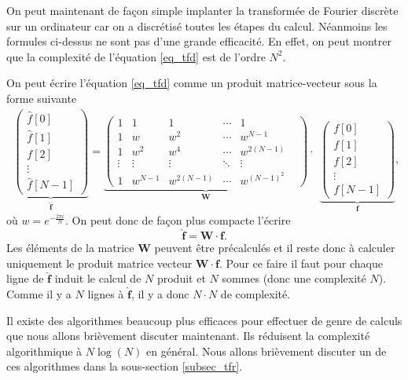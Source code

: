 \documentclass[a4paper,12pt]{book}
\newcommand{\fh}{\hat{f}}
\begin{document}
On peut maintenant de façon simple implanter la transformée de Fourier discrète sur un
ordinateur car on a discrétisé toutes les étapes du calcul. Néanmoins les formules ci-dessus 
ne sont pas d'une grande efficacité. En effet, on peut montrer que la complexité de
l'équation \eqref{eq_tfd} est de l'ordre $N^2$. 

On peut écrire l'équation \eqref{eq_tfd} comme un produit matrice-vecteur sous la forme suivante
$$
\begin{array}{l} \underbrace{\begin{pmatrix} \fh[0] \\ \fh[1] \\ f[2] \\ \vdots \\ \fh[N-1] \end{pmatrix}}_{\hat{\bm{f}}} = \underbrace{\begin{pmatrix} 1 & 1 & 1 & \cdots & 1\\ 1 & w & w^2 & \cdots & w^{N-1}\\ 1 & w^2 & w^4 & \cdots & w^{2(N-1)}\\ \vdots & \vdots & \vdots & \ddots & \vdots &\\ 1 & w^{N-1} & w^{2(N-1)} & \cdots & w^{(N-1)^2} \end{pmatrix}}_{\bm{W}}\cdot \end{array} \underbrace{\begin{pmatrix} f[0] \\ f[1] \\ f[2] \\ \vdots \\ f[N-1] \end{pmatrix}}_{\bm{f}},
$$
où $w = e^{-\frac{2 \pi i}{N}}$. On peut donc de façon plus compacte l'écrire 
\begin{equation}
 \hat{\bm{f}}=\bm{W}\cdot \bm{f}.
\end{equation}
Les éléments de la matrice $\bm{W}$ peuvent être précalculés et il reste donc à calculer
uniquement le produit matrice vecteur $\bm{W}\cdot\bm{f}$. Pour ce faire il faut pour chaque
ligne de $\hat{\bm{f}}$ induit le calcul de $N$ produit et $N$ sommes (donc une complexité
$N$). Comme il y a $N$ lignes à $\hat{\bm{f}}$, il y a donc $N\cdot N$ de complexité.

Il existe des algorithmes beaucoup plus efficaces pour effectuer de genre de calculs que
nous allons brièvement discuter maintenant. Ils réduisent la complexité algorithmique à 
$N\log(N)$ en général. Nous allons brièvement discuter un de ces algorithmes dans la 
sous-section \ref{subsec_tfr}.
\end{document}
